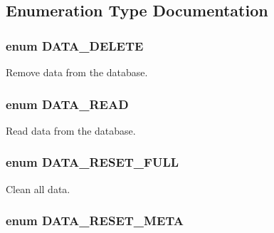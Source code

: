 \subsection{Enumeration Type Documentation}
\hypertarget{class_8datahandler_8php_b4fa180fa2d24c38e425ff9ca4c913fa}{
\subsubsection{\setlength{\rightskip}{0pt plus 5cm}enum {\bf DATA\_\-DELETE}}}
\label{class_8datahandler_8php_b4fa180fa2d24c38e425ff9ca4c913fa}


Remove data from the database. 

\hypertarget{class_8datahandler_8php_c28f74b49007773d24ca2207baac6d32}{
\subsubsection{\setlength{\rightskip}{0pt plus 5cm}enum {\bf DATA\_\-READ}}}
\label{class_8datahandler_8php_c28f74b49007773d24ca2207baac6d32}


Read data from the database. 

\hypertarget{class_8datahandler_8php_2a28429433990da242faa223d5a49f0a}{
\subsubsection{\setlength{\rightskip}{0pt plus 5cm}enum {\bf DATA\_\-RESET\_\-FULL}}}
\label{class_8datahandler_8php_2a28429433990da242faa223d5a49f0a}


Clean all data. 

\hypertarget{class_8datahandler_8php_3ce9f928f9ba75096925bd4157246bbb}{
\subsubsection{\setlength{\rightskip}{0pt plus 5cm}enum {\bf DATA\_\-RESET\_\-META}}}
\label{class_8datahandler_8php_3ce9f928f9ba75096925bd4157246bbb}


